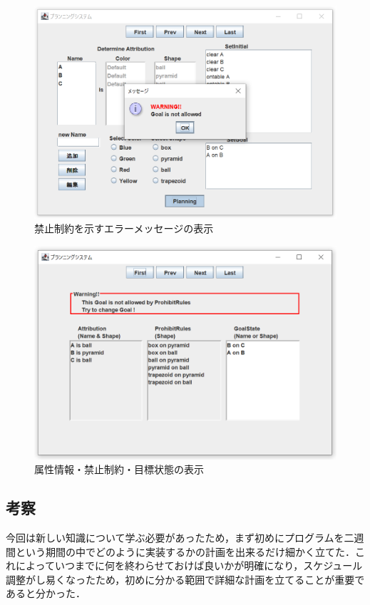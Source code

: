 \documentclass[12pt]{jarticle}
\begin{document}
\begin{figure}[htbp]
  \begin{center}
    \includegraphics[scale=0.6]{images/prohibit1.PNG}
    \caption{禁止制約を示すエラーメッセージの表示}
    \label{fig:prohibit1}
  \end{center}
\end{figure}
\begin{figure}[htbp]
  \begin{center}
    \includegraphics[scale=0.6]{images/prohibit2.PNG}
    \caption{属性情報・禁止制約・目標状態の表示}
    \label{fig:prohibit2}
  \end{center}
\end{figure}

\clearpage
\subsection{考察}
今回は新しい知識について学ぶ必要があったため，まず初めにプログラムを二週間という期間の中でどのように実装するかの計画を出来るだけ細かく立てた．これによっていつまでに何を終わらせておけば良いかが明確になり，スケジュール調整がし易くなったため，初めに分かる範囲で詳細な計画を立てることが重要であると分かった．\\
\end{document}
